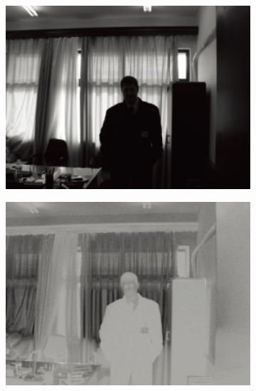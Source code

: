 \documentclass[letterpaper,10pt]{article}
\begin{document}
\begin{figure}[htbp]
\begin{subfigure}{0.11\textwidth}
					\includegraphics[width=\linewidth]{picture/LLIE/Division Gets Better/Y2}
					\captionsetup{font=scriptsize}
					\label{fig: Y2}	
				\end{subfigure}
				\begin{subfigure}{0.11\textwidth}
					\includegraphics[width=\linewidth]{picture/LLIE/Division Gets Better/Cb2}
					\captionsetup{font=scriptsize}
					\label{fig: Cb2}	
				\end{subfigure}
				\begin{subfigure}{0.11\textwidth}

\end{subfigure}
\end{figure}
\end{document}
